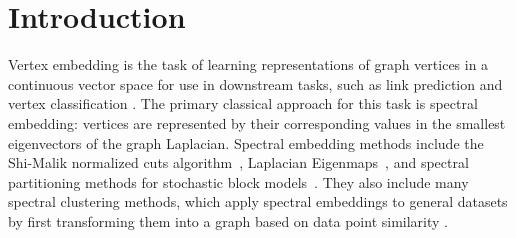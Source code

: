 \documentclass[sigconf]{acmart}
\begin{document}

\maketitle

\section{Introduction}
Vertex embedding is the task of learning representations of graph vertices in a continuous vector space for use in downstream tasks, such as link prediction and vertex classification \cite{yan2006graph}.
The primary classical approach for this task is spectral embedding: vertices are represented by their corresponding values in the smallest eigenvectors of the graph Laplacian. Spectral embedding methods include the Shi-Malik normalized cuts algorithm~\cite{shi2000normalized}, Laplacian Eigenmaps~\cite{belkin2003laplacian}, and spectral partitioning methods for stochastic block models~\cite{mcsherry2001spectral}. They also include many spectral clustering methods, which apply spectral embeddings to general datasets by first transforming them into a graph based on data point similarity \cite{ng2002spectral}.
\end{document}
